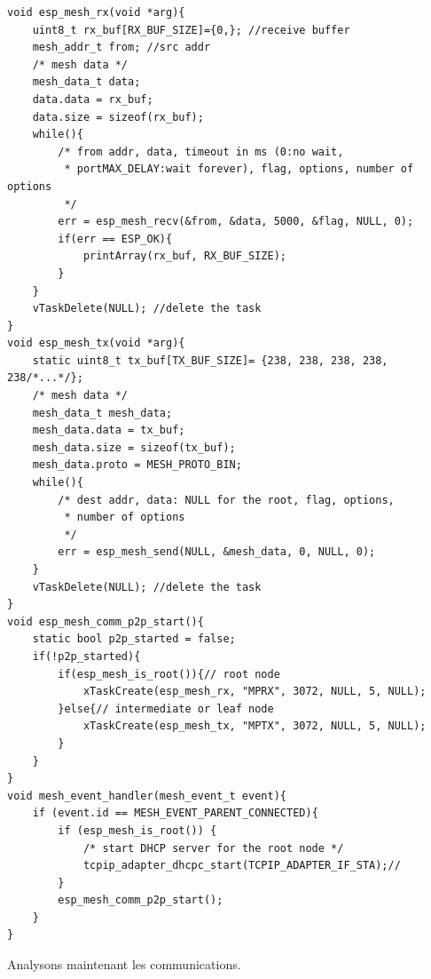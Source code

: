             \begin{verbatim}
void esp_mesh_rx(void *arg){
    uint8_t rx_buf[RX_BUF_SIZE]={0,}; //receive buffer
    mesh_addr_t from; //src addr
    /* mesh data */
    mesh_data_t data;
    data.data = rx_buf;
    data.size = sizeof(rx_buf);
    while(){
        /* from addr, data, timeout in ms (0:no wait, 
         * portMAX_DELAY:wait forever), flag, options, number of options
         */
        err = esp_mesh_recv(&from, &data, 5000, &flag, NULL, 0);
        if(err == ESP_OK){
            printArray(rx_buf, RX_BUF_SIZE);
        }
    }
    vTaskDelete(NULL); //delete the task
}
void esp_mesh_tx(void *arg){
    static uint8_t tx_buf[TX_BUF_SIZE]= {238, 238, 238, 238, 238/*...*/};
    /* mesh data */
    mesh_data_t mesh_data;
    mesh_data.data = tx_buf;
    mesh_data.size = sizeof(tx_buf);
    mesh_data.proto = MESH_PROTO_BIN;
    while(){
        /* dest addr, data: NULL for the root, flag, options,
         * number of options
         */
        err = esp_mesh_send(NULL, &mesh_data, 0, NULL, 0);
    }
    vTaskDelete(NULL); //delete the task
}
void esp_mesh_comm_p2p_start(){
    static bool p2p_started = false;
    if(!p2p_started){
        if(esp_mesh_is_root()){// root node
            xTaskCreate(esp_mesh_rx, "MPRX", 3072, NULL, 5, NULL);       
        }else{// intermediate or leaf node
            xTaskCreate(esp_mesh_tx, "MPTX", 3072, NULL, 5, NULL);
        }
    }
}
void mesh_event_handler(mesh_event_t event){
    if (event.id == MESH_EVENT_PARENT_CONNECTED){
        if (esp_mesh_is_root()) {
            /* start DHCP server for the root node */
            tcpip_adapter_dhcpc_start(TCPIP_ADAPTER_IF_STA);//
        }
        esp_mesh_comm_p2p_start();
    }
}
            \end{verbatim}
            Analysons maintenant les communications.
